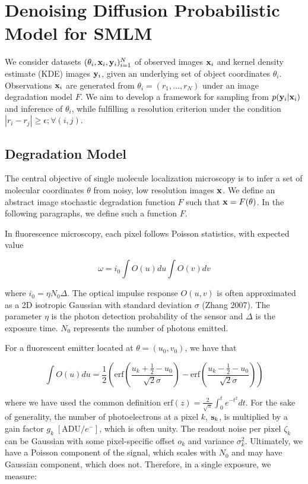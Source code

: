 \documentclass{article}
\begin{document}
\section{Denoising Diffusion Probabilistic Model for SMLM}

We consider datasets $(\theta_{i}, \bold{x}_i,\bold{y}_i)_{i=1}^{N}$ of observed images $\bold{x}_i$ and kernel density estimate (KDE) images $\bold{y}_{i}$, given an underlying set of object coordinates $\theta_{i}$. Observations $\bold{x}_i$ are generated from $\theta_{i}=(r_{1},...,r_{N})$ under an image degradation model $F$. We aim to develop a framework for sampling from $p(\bold{y}_{i}|\bold{x}_{i})$ and inference of $\theta_{i}$, while fulfilling a resolution criterion under the condition $|r_{i}-r_{j}| \geq \epsilon ; \forall (i,j)$. 

\subsection{Degradation Model}

The central objective of single molecule localization microscopy is to infer a set of molecular coordinates $\theta$ from noisy, low resolution images $\bold{x}$. We define an abstract image stochastic degradation function $F$ such that $\bold{x} = F(\theta)$. In the following paragraphs, we define such a function $F$. 

In fluorescence microscopy, each pixel follows Poisson statistics, with expected value

\begin{equation}
\omega = i_{0}\int O(u)du\int O(v)dv
\end{equation}

where $i_{0} = \eta N_{0}\Delta$. The optical impulse response $O(u,v)$ is often approximated as a 2D isotropic Gaussian with standard deviation $\sigma$ (Zhang 2007). The parameter $\eta$ is the photon detection probability of the sensor and $\Delta$ is the exposure time. $N_{0}$ represents the number of photons emitted.

For a fluorescent emitter located at $\theta = (u_{0},v_{0})$, we have that

\begin{equation}
\int O(u)du = \frac{1}{2}\left(\mathrm{erf}\left(\frac{u_{k}+\frac{1}{2}-u_{0}}{\sqrt{2}\sigma}\right) -\mathrm{erf}\left(\frac{u_{k}-\frac{1}{2}-u_{0}}{\sqrt{2}\sigma}\right)\right)
\end{equation}

where we have used the common definition $\mathrm{erf}(z) = \frac{2}{\sqrt{\pi}}\int_{0}^{t}e^{-t^{2}}dt$. For the sake of generality, the number of photoelectrons at a pixel $k$, $\bold{s}_k$, is  multiplied by a gain factor $g_k \;[\mathrm{ADU}/e^{-}]$, which is often unity. The readout noise per pixel $\zeta_{k}$ can be Gaussian with some pixel-specific offset $o_{k}$ and variance $\sigma_{k}^{2}$. Ultimately, we have a Poisson component of the signal, which scales with $N_{0}$ and may have Gaussian component, which does not. Therefore, in a single exposure, we measure: 
\end{document}
